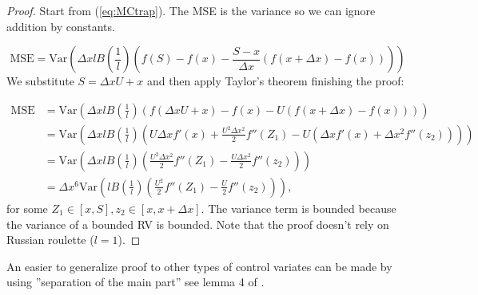\documentclass[a4paper,12pt]{article}
\begin{document}
\begin{proof}
    Start from (\ref{eq:MCtrap}). The MSE is the variance
    so we can ignore addition by constants.

    \begin{equation}
        \text{MSE} = \text{Var}\left( \Delta x l B\left( \frac{1}{l}\right)
        \left(f(S) - f(x) - \frac{S - x}{\Delta x}
        \left(f(x+\Delta x) - f(x)\right) \right)\right)
    \end{equation}
    We substitute $S = \Delta x U + x$ and then apply Taylor's theorem
    finishing the proof:

    \begin{align}
        \text{MSE} & = \text{Var}\left( \Delta x l B\left( \frac{1}{l}\right)
        \left(f(\Delta x U+x) - f(x) - U
        \left(f(x+\Delta x) - f(x)\right) \right)\right)                           \\
                   & = \text{Var}\left( \Delta x l B\left( \frac{1}{l}\right)
        \left( U \Delta x f'(x)+ \frac{U^{2} \Delta x ^{2}}{2} f''(Z_{1})
        - U \left( \Delta x f'(x) +
        \Delta x ^{2} f''(z_{2})\right) \right)\right)                             \\
                   & = \text{Var}\left( \Delta x l B\left( \frac{1}{l}\right)
        \left( \frac{U^{2} \Delta x ^{2}}{2} f''(Z_{1})
        -  \frac{U\Delta x ^{2}}{2} f''(z_{2}) \right)\right)                      \\
                   & =\Delta x ^{6} \text{Var}\left(  l B\left( \frac{1}{l}\right)
        \left( \frac{U^{2} }{2} f''(Z_{1})
        -  \frac{U}{2} f''(z_{2}) \right)\right),
    \end{align}
    for some $Z_{1} \in [x,S], z_{2} \in [x,x+\Delta x]$. The variance term is bounded
    because the variance of a bounded RV is bounded.
    Note that the proof doesn't rely on Russian roulette ($l=1$).
\end{proof}

\begin{related}
    An easier to generalize proof to other types of control variates
    can be made by using ''separation of the main part''
    see lemma 4 of \cite{mathe_monte_nodate}.
\end{related}
\end{document}

